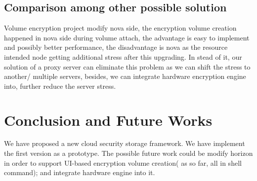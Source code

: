 \documentclass[10pt]{report}
\begin{document}
			\subsection{Comparison among other possible solution}
			Volume encryption project \cite{volumeencryptionwiki} modify nova side, the encryption volume creation happened in nova side during volume attach, the advantage is easy to implement and possibly better performance, the disadvantage is nova as the resource intended node getting additional stress after this upgrading. In stead of it, our solution of a proxy server can eliminate this problem as we can shift the stress to another/ multiple servers, besides, we can integrate hardware encryption engine into, further reduce the server stress.\\
		\section{Conclusion and Future Works}
			We have proposed a new cloud security storage framework. We have implement the first version as a prototype. The possible future work could be modify horizon in order to support UI-based encryption volume creation( as so far, all in shell command); and integrate hardware engine\cite{Ren13} into it.
			
	
	
\end{document}
